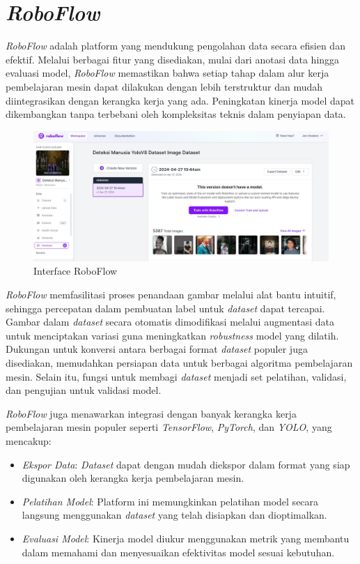 \section{\emph{RoboFlow}}
\label{sec:RoboFlow}

\emph{RoboFlow} adalah platform yang mendukung pengolahan data secara efisien dan efektif. Melalui berbagai fitur yang disediakan, mulai dari anotasi data hingga evaluasi model, \emph{RoboFlow} memastikan bahwa setiap tahap dalam alur kerja pembelajaran mesin dapat dilakukan dengan lebih terstruktur dan mudah diintegrasikan dengan kerangka kerja yang ada. Peningkatan kinerja model dapat dikembangkan tanpa terbebani oleh kompleksitas teknis dalam penyiapan data.

\begin{figure}[H]
  \centering
  \includegraphics[scale=0.3]{gambar/roboflow.jpg}
  \caption{Interface RoboFlow}
  \label{fig:roboflow}
\end{figure}

\emph{RoboFlow} memfasilitasi proses penandaan gambar melalui alat bantu intuitif, sehingga percepatan dalam pembuatan label untuk \emph{dataset} dapat tercapai. Gambar dalam \emph{dataset} secara otomatis dimodifikasi melalui augmentasi data untuk menciptakan variasi guna meningkatkan \emph{robustness} model yang dilatih. Dukungan untuk konversi antara berbagai format \emph{dataset} populer juga disediakan, memudahkan persiapan data untuk berbagai algoritma pembelajaran mesin. Selain itu, fungsi untuk membagi \emph{dataset} menjadi set pelatihan, validasi, dan pengujian untuk validasi model.

\emph{RoboFlow} juga menawarkan integrasi dengan banyak kerangka kerja pembelajaran mesin populer seperti \emph{TensorFlow}, \emph{PyTorch}, dan \emph{YOLO}, yang mencakup:

\begin{itemize}
    \item \emph{Ekspor Data}: \emph{Dataset} dapat dengan mudah diekspor dalam format yang siap digunakan oleh kerangka kerja pembelajaran mesin.
    \item \emph{Pelatihan Model}: Platform ini memungkinkan pelatihan model secara langsung menggunakan \emph{dataset} yang telah disiapkan dan dioptimalkan.
    \item \emph{Evaluasi Model}: Kinerja model diukur menggunakan metrik yang membantu dalam memahami dan menyesuaikan efektivitas model sesuai kebutuhan.
\end{itemize}

